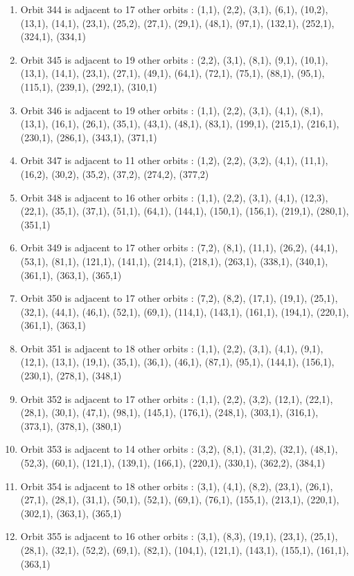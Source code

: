 \documentclass[12pt]{article}
\begin{document}
\begin{enumerate}
\item Orbit 344 is adjacent to 17 other orbits : (1,1), (2,2), (3,1), (6,1), (10,2), (13,1), (14,1), (23,1), (25,2), (27,1), (29,1), (48,1), (97,1), (132,1), (252,1), (324,1), (334,1)
\item Orbit 345 is adjacent to 19 other orbits : (2,2), (3,1), (8,1), (9,1), (10,1), (13,1), (14,1), (23,1), (27,1), (49,1), (64,1), (72,1), (75,1), (88,1), (95,1), (115,1), (239,1), (292,1), (310,1)
\item Orbit 346 is adjacent to 19 other orbits : (1,1), (2,2), (3,1), (4,1), (8,1), (13,1), (16,1), (26,1), (35,1), (43,1), (48,1), (83,1), (199,1), (215,1), (216,1), (230,1), (286,1), (343,1), (371,1)
\item Orbit 347 is adjacent to 11 other orbits : (1,2), (2,2), (3,2), (4,1), (11,1), (16,2), (30,2), (35,2), (37,2), (274,2), (377,2)
\item Orbit 348 is adjacent to 16 other orbits : (1,1), (2,2), (3,1), (4,1), (12,3), (22,1), (35,1), (37,1), (51,1), (64,1), (144,1), (150,1), (156,1), (219,1), (280,1), (351,1)
\item Orbit 349 is adjacent to 17 other orbits : (7,2), (8,1), (11,1), (26,2), (44,1), (53,1), (81,1), (121,1), (141,1), (214,1), (218,1), (263,1), (338,1), (340,1), (361,1), (363,1), (365,1)
\item Orbit 350 is adjacent to 17 other orbits : (7,2), (8,2), (17,1), (19,1), (25,1), (32,1), (44,1), (46,1), (52,1), (69,1), (114,1), (143,1), (161,1), (194,1), (220,1), (361,1), (363,1)
\item Orbit 351 is adjacent to 18 other orbits : (1,1), (2,2), (3,1), (4,1), (9,1), (12,1), (13,1), (19,1), (35,1), (36,1), (46,1), (87,1), (95,1), (144,1), (156,1), (230,1), (278,1), (348,1)
\item Orbit 352 is adjacent to 17 other orbits : (1,1), (2,2), (3,2), (12,1), (22,1), (28,1), (30,1), (47,1), (98,1), (145,1), (176,1), (248,1), (303,1), (316,1), (373,1), (378,1), (380,1)
\item Orbit 353 is adjacent to 14 other orbits : (3,2), (8,1), (31,2), (32,1), (48,1), (52,3), (60,1), (121,1), (139,1), (166,1), (220,1), (330,1), (362,2), (384,1)
\item Orbit 354 is adjacent to 18 other orbits : (3,1), (4,1), (8,2), (23,1), (26,1), (27,1), (28,1), (31,1), (50,1), (52,1), (69,1), (76,1), (155,1), (213,1), (220,1), (302,1), (363,1), (365,1)
\item Orbit 355 is adjacent to 16 other orbits : (3,1), (8,3), (19,1), (23,1), (25,1), (28,1), (32,1), (52,2), (69,1), (82,1), (104,1), (121,1), (143,1), (155,1), (161,1), (363,1)

\end{enumerate}
\end{document}
